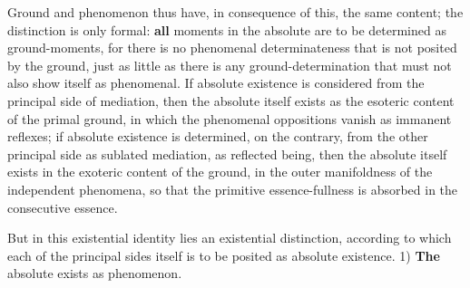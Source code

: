 \documentclass[12pt,a4paper,openany]{book}
\newcommand{\opage}[1]{\marginnote{\footnotesize\textit{[#1]}}}
\begin{document}
Ground and phenomenon thus have, in consequence of this,
the same content; the distinction is only formal: \textbf{all}
moments in the absolute are to be determined as ground-moments,
for there is no phenomenal determinateness
that is not posited by the ground, just as little
as there is any ground-determination that must not also
show itself as phenomenal. If absolute
existence is considered from the principal side of mediation, then
the absolute itself exists as the esoteric content of the primal ground,
in which the phenomenal oppositions vanish
as immanent reflexes; if absolute existence
is determined, on the contrary, from the other principal side as sublated
mediation, as reflected being, then the absolute
itself exists in the exoteric content of the ground, in the outer manifoldness
of the independent phenomena, so that
the primitive essence-fullness is absorbed in the consecutive
essence.

But in this existential identity lies an existential
distinction, according to which each of the principal sides itself
is to be posited as absolute existence.
\setcounter{footnote}{0}%
\opage{160}1) \textbf{The} absolute exists as phenomenon.
\end{document}
